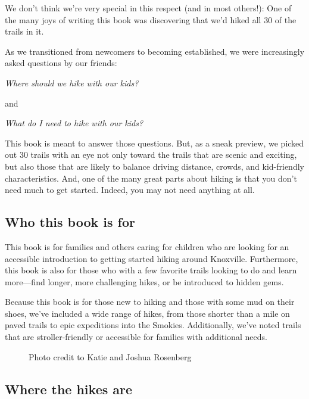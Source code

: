 \documentclass[
  letterpaper,
  DIV=11,
  numbers=noendperiod]{scrreprt}
\makeatletter
\newcommand*\pandocbounded[1]{%
  \sbox\pandoc@box{#1}%
  \Gscale@div\@tempa{\textheight}{\dimexpr\ht\pandoc@box+\dp\pandoc@box\relax}%
  \Gscale@div\@tempb{\linewidth}{\wd\pandoc@box}%
  \ifdim\@tempb\p@<\@tempa\p@\let\@tempa\@tempb\fi%
  \ifdim\@tempa\p@<\p@\scalebox{\@tempa}{\usebox\pandoc@box}%
  \else\usebox{\pandoc@box}%
  \fi%
}
\makeatother
\begin{document}
We don't think we're very special in this respect (and in most others!):
One of the many joys of writing this book was discovering that we'd
hiked all 30 of the trails in it.

As we transitioned from newcomers to becoming established, we were
increasingly asked questions by our friends:

\emph{Where should we hike with our kids?}

and

\emph{What do I need to hike with our kids?}

This book is meant to answer those questions. But, as a sneak preview,
we picked out 30 trails with an eye not only toward the trails that are
scenic and exciting, but also those that are likely to balance driving
distance, crowds, and kid-friendly characteristics. And, one of the many
great parts about hiking is that you don't need much to get started.
Indeed, you may not need anything at all.

\subsection{Who this book is for}\label{who-this-book-is-for}

This book is for families and others caring for children who are looking
for an accessible introduction to getting started hiking around
Knoxville. Furthermore, this book is also for those who with a few
favorite trails looking to do and learn more---find longer, more
challenging hikes, or be introduced to hidden gems.

Because this book is for those new to hiking and those with some mud on
their shoes, we've included a wide range of hikes, from those shorter
than a mile on paved trails to epic expeditions into the Smokies.
Additionally, we've noted trails that are stroller-friendly or
accessible for families with additional needs.

\begin{figure}[H]

{\centering \pandocbounded{\texttt{[image: img/ayla-flowers.jpg]}}

}

\caption{Photo credit to Katie and Joshua Rosenberg}

\end{figure}%

\subsection{Where the hikes are}\label{where-the-hikes-are}
\end{document}
